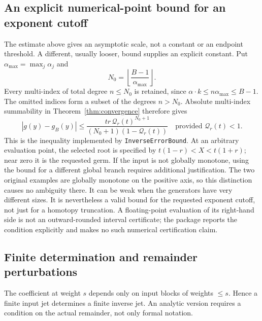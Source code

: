 \documentclass[11pt,a4paper]{article}
\theoremstyle{definition}
\begin{document}
\subsection{An explicit numerical-point bound for an exponent cutoff}
The estimate above gives an asymptotic scale, not a constant or an endpoint
threshold. A different, usually looser, bound supplies an explicit constant.
Put \(\alpha_{\max}=\max_j\alpha_j\) and
\begin{equation}\label{eq:safedegree}
 N_0=\left\lfloor\frac{B-1}{\alpha_{\max}}\right\rfloor.
\end{equation}
Every multi-index of total degree \(n\le N_0\) is retained, since
\(\alpha\cdot k\le n\alpha_{\max}\le B-1\).
The omitted indices form a subset of the degrees \(n>N_0\). Absolute
multi-index summability in Theorem~\ref{thm:convergence} therefore gives
\begin{equation}\label{eq:cutoff-bound}
 \boxed{\displaystyle
 |g(y)-g_B(y)|\le
 \frac{t r\,\mathcal Q_r(t)^{N_0+1}}
 {(N_0+1)(1-\mathcal Q_r(t))}}
 \quad\text{provided }\mathcal Q_r(t)<1.
\end{equation}
This is the inequality implemented by \texttt{InverseErrorBound}. At an
arbitrary evaluation point, the selected root is specified by
\(t(1-r)<X<t(1+r)\); near zero it is the requested germ. If the input is
not globally monotone, using the bound for a different global branch requires
additional justification. The two original examples are globally monotone
on the positive axis, so this distinction causes no ambiguity there. It can be
weak when the generators have very different sizes. It is nevertheless a
valid bound for the requested exponent cutoff, not just for a homotopy
truncation. A floating-point evaluation of its right-hand side is not an
outward-rounded interval certificate; the package reports the condition
explicitly and makes no such numerical certification claim.

\subsection{Finite determination and remainder perturbations}
The coefficient at weight \(s\) depends only on input blocks of weights
\(\le s\). Hence a finite input jet determines a finite inverse jet.
An analytic version requires a condition on the actual remainder, not only
formal notation.
\end{document}

